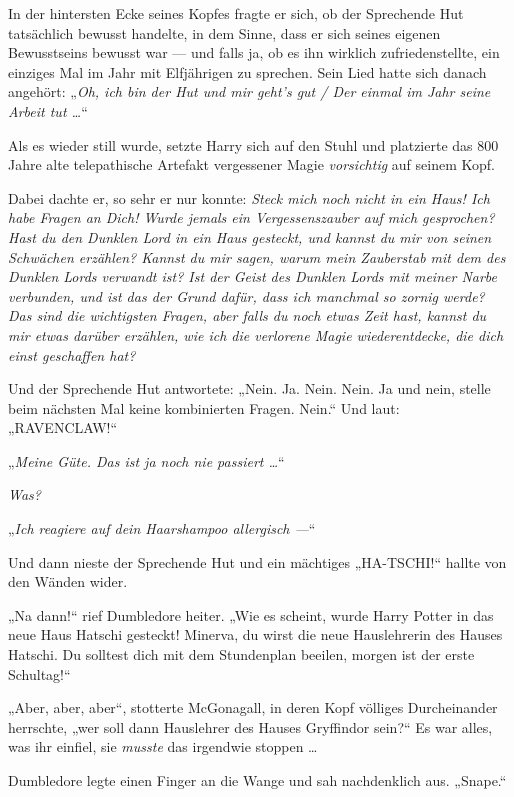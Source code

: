 \later

In der hintersten Ecke seines Kopfes fragte er sich, ob der Sprechende Hut tatsächlich bewusst handelte, in dem Sinne, dass er sich seines eigenen Bewusstseins bewusst war — und falls ja, ob es ihn wirklich zufriedenstellte, ein einziges Mal im Jahr mit Elfjährigen zu sprechen. Sein Lied hatte sich danach angehört:
„\emph{Oh, ich bin der Hut und mir geht’s gut / Der einmal im Jahr seine Arbeit tut …}“

Als es wieder still wurde, setzte Harry sich auf den Stuhl und platzierte das 800 Jahre alte telepathische Artefakt vergessener Magie \emph{vorsichtig} auf seinem Kopf.

Dabei dachte er, so sehr er nur konnte: \emph{Steck mich noch nicht in ein Haus! Ich habe Fragen an Dich! Wurde jemals ein Vergessenszauber auf mich gesprochen? Hast du den Dunklen Lord in ein Haus gesteckt, und kannst du mir von seinen Schwächen erzählen? Kannst du mir sagen, warum mein Zauberstab mit dem des Dunklen Lords verwandt ist? Ist der Geist des Dunklen Lords mit meiner Narbe verbunden, und ist das der Grund dafür, dass ich manchmal so zornig werde? Das sind die wichtigsten Fragen, aber falls du noch etwas Zeit hast, kannst du mir etwas darüber erzählen, wie ich die verlorene Magie wiederentdecke, die dich einst geschaffen hat?}

Und der Sprechende Hut antwortete:
„Nein. Ja. Nein. Nein. Ja und nein, stelle beim nächsten Mal keine kombinierten Fragen. Nein.“ Und laut:
„RAVENCLAW!“

\later

„\emph{Meine Güte. Das ist ja noch nie passiert …}“

\emph{Was?}

„\emph{Ich reagiere auf dein Haarshampoo allergisch —}“

Und dann nieste der Sprechende Hut und ein mächtiges
„HA-TSCHI!“ hallte von den Wänden wider.

„Na dann!“ rief Dumbledore heiter.
„Wie es scheint, wurde Harry Potter in das neue Haus Hatschi gesteckt! Minerva, du wirst die neue Hauslehrerin des Hauses Hatschi. Du solltest dich mit dem Stundenplan beeilen, morgen ist der erste Schultag!“

„Aber, aber, aber“, stotterte McGonagall, in deren Kopf völliges Durcheinander herrschte, „wer soll dann Hauslehrer des Hauses Gryffindor sein?“ Es war alles, was ihr einfiel, sie \emph{musste} das irgendwie stoppen …

Dumbledore legte einen Finger an die Wange und sah nachdenklich aus.
„Snape.“

